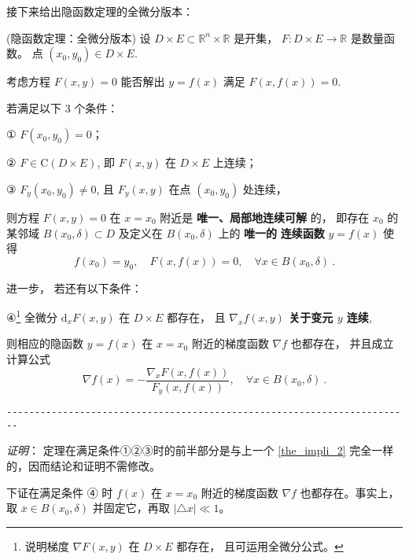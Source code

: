 接下来给出隐函数定理的全微分版本：
 \begin{theorem}{(隐函数定理：全微分版本)}
 设 $D\times E\subset\mathbb{R}^{n}\times\mathbb{R}$ 是开集， $F:D\times E\rightarrow\mathbb{R}$
是数量函数。 点 $(x_{0},y_{0})\in D\times E.$ 

考虑方程 $F(x,y)=0$ 能否解出 $y=f(x)$ 满足 $F(x,f(x))=0.$ 

若满足以下 3 个条件：

① $F(x_{0},y_{0})=0$；

② $F\in\mathrm{C}(D\times E)$, 即 $F(x,y)$ 在 $D\times E$ 上连续； 

③ $F_{y}(x_{0},y_{0})\neq0$, 且 $F_{y}(x,y)$ 在点 $(x_0,y_0)$ 处连续，

则方程 $F(x,y)=0$ 在 $x=x_{0}$ 附近是\textbf{ 唯一、局部地连续可解} 的， 即存在 $x_{0}$
的某邻域 $B(x_{0},\delta)\subset D$ 及定义在 $B(x_{0},\delta)$ 上的 \textbf{唯一的} \textbf{
连续函数} $y=f(x)$ 使得
$$
f(x_{0})=y_{0},\quad F(x,f(x))=0,\quad\forall x\in B(x_{0},\delta)~.
$$

进一步， 若还有以下条件：

④\footnote{说明梯度 $\nabla F(x,y)$ 在 $D\times E$ 都存在， 且可运用全微分公式。} 全微分 $\mathrm{d}_{x}F(x,y)$ 在 $D\times E$ 都存在， 且 \textbf{$\nabla_x f(x,y)$ 关于变元 $y$ 连续},

则相应的隐函数 $y=f(x)$ 在 $x=x_{0}$ 附近的梯度函数 $\nabla f$ 也都存在， 并且成立计算公式
$$
\nabla f(x)=-{\displaystyle \frac{\nabla_{x}F(x,f(x))}{F_{y}(x,f(x))}},\quad\forall x\in B(x_{0},\delta)~.
$$

\verb|------------------------------------------------------------------------|

\textsl{证明}： 定理在满足条件①②③时的前半部分是与上一个 \autoref{the_impli_2} 完全一样的，因而结论和证明不需修改。

下证在满足条件 ④ 时 $f(x)$ 在 $x=x_{0}$ 附近的梯度函数 $\nabla f$ 也都存在。事实上， 取 $\overline{x}\in B(x_{0},\delta)$ 并固定它，再取 $\left|\triangle x\right|\ll1$。 %


\end{theorem}
